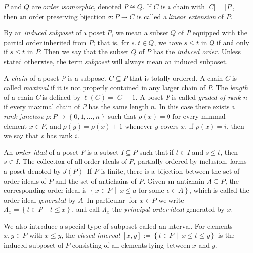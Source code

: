 \documentclass[a4paper,11pt]{amsart}
\theoremstyle{definition}
\numberwithin{equation}{section}
\begin{document}
$P$ and $Q$ are \textsl{order isomorphic},
denoted $P \cong Q$.
If $C$ is a chain with $|C| = |P|$, 
then an order preserving bijection $\sigma: P \to C$ is called a \textsl{linear extension} of $P$. 
%
\par
%
By an \textsl{induced subposet} of a poset $P$, 
we mean a subset $Q$ of $P$ 
equipped with the partial order inherited from $P$; that is,
for $s,t\in Q$, we have $s \leq t$ in $Q$ if and only if $s \leq t$ in $P$.
Then we say that the subset $Q$ of $P$ has the \textsl{induced order}.
Unless stated otherwise, the term \textsl{subposet} will always mean an induced subposet.
%
\par
%
A \textsl{chain} of a poset $P$ is a subposet $C\subseteq P$ that is totally ordered.
A chain $C$ is called \textsl{maximal} 
if it is not properly contained in any larger chain of $P$. 
The \textsl{length} of a chain $C$ is defined by $\ell(C)= |C| - 1 $.
A poset $P$ is called \textsl{graded of rank $n$}
if every maximal chain of $P$ has the same length $n$.
In this case there exists a \textsl{rank function}
$\rho \colon P \rightarrow \left\{ 0,1,...,n \right\}$ 
such that $\rho(x) = 0$ for every minimal element $x \in P$,
and $\rho(y) = \rho(x) + 1$
whenever $y$ covers $x$. 
If $\rho(x) = i$, 
then we say that $x$ has rank $i$.
%
\par
%
An \textsl{order ideal} of a poset $P$ is a subset $I \subseteq P$
such that if $t \in I$ and $s \leq t$, then $s \in I$. 
The collection of all order ideals of $P$, partially ordered by inclusion, forms a poset denoted by $J(P)$.
If $P$ is finite, there is a bijection between the set of order ideals of $P$ 
and the set of antichains of $P$.
Given an antichain $A \subseteq P$,
the corresponding order ideal is 
$\left\{ x \in P \, \middle| \, x \leq a \textrm{ for some } a \in A \right\}$,
which is called the order ideal \textsl{generated} by $A$.
In particular, for $x \in P$ 
we write $\Lambda_{x} = \left\{ t \in P \, \middle| \, t \leq x \right\}$,
and call $\Lambda_{x}$ the \textsl{principal order ideal} generated by $x$.
%
\par
%
We also introduce a special type of subposet called an interval.
For elements $x, y \in P$ with $x \leq y$,
the \textsl{closed interval} 
$
[x, y]:=\left\{ t \in P \, \middle| \, x \leq t \leq y \right\}
$
is the induced subposet of $P$
 consisting of all elements lying between $x$ and $y$.
%
\end{document}
